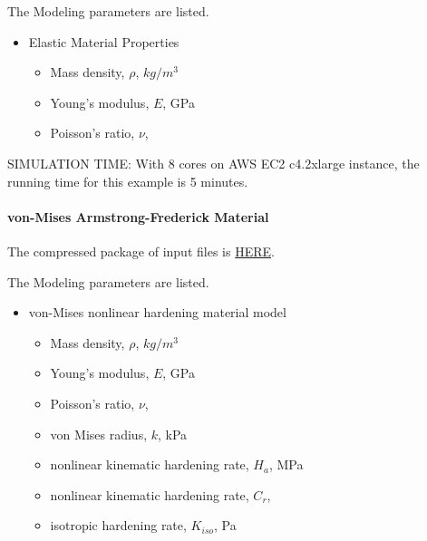 The Modeling parameters are listed.
\begin{itemize}
  \item Elastic Material Properties 
  \begin{itemize}
    \item Mass density, $\rho$, \enspace {} $kg/m^3$
    \item Young's modulus, $E$, \enspace {} GPa
    \item Poisson's ratio, $\nu$, \enspace {}
  \end{itemize}
\end{itemize}


SIMULATION TIME: With 8 cores on AWS EC2 c4.2xlarge instance, the running time for this example is 5 minutes.

\paragraph{von-Mises Armstrong-Frederick Material}
The compressed package of input files is  
\href{https://github.com/yuan-energy/Real-ESSI-Short-Course-Examples/tree/master/short-course-examples/nonlinear_analysis_steps/free_field_3D/elastoplastic/elastoplastic.tgz?raw=true}{HERE}. 

The Modeling parameters are listed.
\begin{itemize}
  \item von-Mises nonlinear hardening material model 
  \begin{itemize}
    \item Mass density, $\rho$, \enspace {} $kg/m^3$
    \item Young's modulus, $E$, \enspace {} GPa
    \item Poisson's ratio, $\nu$, \enspace {}
    \item von Mises radius, $k$, \enspace {} kPa
    \item nonlinear kinematic hardening rate, $H_a$, \enspace {} MPa
    \item nonlinear kinematic hardening rate, $C_r$, \enspace {}
    \item isotropic hardening rate, $K_{iso}$, \enspace {} Pa
  \end{itemize}
\end{itemize}

